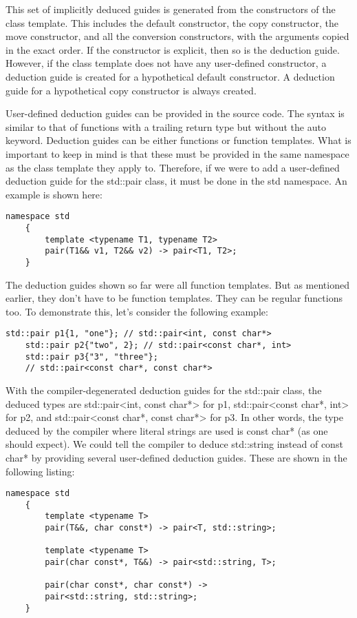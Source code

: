 This set of implicitly deduced guides is generated from the constructors of the class template. This includes the default constructor, the copy constructor, the move constructor, and all the conversion constructors, with the arguments copied in the exact order. If the constructor is explicit, then so is the deduction guide. However, if the class template does not have any user-defined constructor, a deduction guide is created for a hypothetical default constructor. A deduction guide for a hypothetical copy constructor is always created.

User-defined deduction guides can be provided in the source code. The syntax is similar to that of functions with a trailing return type but without the auto keyword. Deduction guides can be either functions or function templates. What is important to keep in mind is that these must be provided in the same namespace as the class template they apply to. Therefore, if we were to add a user-defined deduction guide for the std::pair class, it must be done in the std namespace. An example is shown here:

\begin{lstlisting}[style=styleCXX]
	namespace std
	{
		template <typename T1, typename T2>
		pair(T1&& v1, T2&& v2) -> pair<T1, T2>;
	}
\end{lstlisting}

The deduction guides shown so far were all function templates. But as mentioned earlier, they don’t have to be function templates. They can be regular functions too. To demonstrate this, let’s consider the following example:

\begin{lstlisting}[style=styleCXX]
	std::pair p1{1, "one"}; // std::pair<int, const char*>
	std::pair p2{"two", 2}; // std::pair<const char*, int>
	std::pair p3{"3", "three"};
	// std::pair<const char*, const char*>
\end{lstlisting}

With the compiler-degenerated deduction guides for the std::pair class, the deduced types are std::pair<int, const char*> for p1, std::pair<const char*, int> for p2, and std::pair<const char*, const char*> for p3. In other words, the type deduced by the compiler where literal strings are used is const char* (as one should expect). We could tell the compiler to deduce std::string instead of const char* by providing several user-defined deduction guides. These are shown in the following listing:

\begin{lstlisting}[style=styleCXX]
	namespace std
	{
		template <typename T>
		pair(T&&, char const*) -> pair<T, std::string>;
		
		template <typename T>
		pair(char const*, T&&) -> pair<std::string, T>;
		
		pair(char const*, char const*) ->
		pair<std::string, std::string>;
	}
\end{lstlisting}

